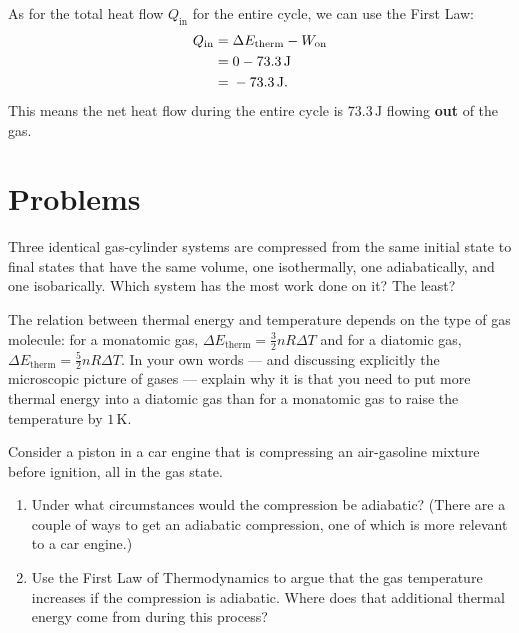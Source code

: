 \begin{example}
As for the total heat flow $Q_\text{in}$ for the entire cycle, we can use
the First Law:
\begin{eqnarray}
  Q_\text{in} =\mathstrut & \Delta E_\text{therm} - W_\text{on}  \\
              =\mathstrut & 0 - 73.3 \,\text{J}  \\
              =\mathstrut & -73.3 \,\text{J}.
\end{eqnarray}
This means the net heat flow during the entire cycle is  $73.3\,\text{J}$
flowing \textbf{out} of the gas.

\end{example}




\section*{Problems}

\begin{exercise} 
 Three identical gas-cylinder systems are compressed from the
 same initial state to final states that have the same volume, one
 isothermally, one adiabatically, and one isobarically. Which
 system has the most work done on it? The least?
\label{prob:ThreeCompress}
\end{exercise}

\begin{exercise}
The relation between thermal energy and temperature depends on the
type of gas molecule:  for a monatomic gas, $\Delta E_\text{therm} =
\frac{3}{2}nR\Delta T$ and for a diatomic gas, $\Delta E_\text{therm} =
\frac{5}{2}nR\Delta T$. In your own words --- and discussing explicitly
the microscopic picture of gases --- explain why it is that you need to
put more thermal energy into a diatomic gas than for a monatomic gas to
raise the temperature by $1\,\text{K}$.
\label{prob:monatomic_vs_diatomic}
\end{exercise}

\begin{exercise}
Consider a piston in a car engine that is compressing an air-gasoline
mixture before ignition, all in the gas state.  
\begin{enumerate}
\item Under what circumstances would the compression be adiabatic? 
(There are a couple of ways to get an adiabatic compression, one of
which is more relevant to a car engine.)
\item Use the First Law of Thermodynamics to argue that the gas
  temperature increases if the compression is adiabatic.  Where does
  that additional thermal energy come from during this process?
\end{enumerate} 
\label{prob:pistonA}
\end{exercise}

